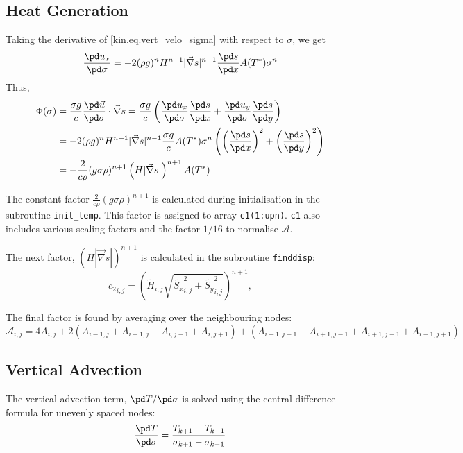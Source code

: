 \subsection{Heat Generation}
Taking the derivative of \eqref{kin.eq.vert_velo_sigma} with respect to $\sigma$, we get
\begin{equation}
  \frac{\pd u_x}{\pd\sigma} = -2(\rho g)^nH^{n+1}|\vec\nabla s|^{n-1}\frac{\pd s}{\pd x}A(T^\ast)\sigma^n
\end{equation}
Thus,
\begin{equation}
\begin{split}
  \Phi(\sigma) &= \frac{\sigma g}c\frac{\pd \vec{u}}{\pd\sigma}\cdot\vec\nabla s  = \frac{\sigma g}c\left(\frac{\pd u_x}{\pd \sigma}\frac{\pd s}{\pd x} + \frac{\pd u_y}{\pd \sigma}\frac{\pd s}{\pd y}\right)\\
       &= -2(\rho g)^nH^{n+1}|\vec\nabla s|^{n-1}\frac{\sigma g}cA(T^\ast)\sigma^n \left(\left(\frac{\pd s}{\pd x}\right)^2+\left(\frac{\pd s}{\pd y}\right)^2\right) \\
       &= -\frac2{c\rho}(g\sigma\rho)^{n+1}\left(H|\vec\nabla s|\right)^{n+1}A(T^\ast)
\end{split}  
\end{equation}

The constant factor $\frac2{c\rho}(g\sigma\rho)^{n+1}$ is calculated during initialisation in the subroutine \texttt{init\_temp}. This factor is assigned to array \texttt{c1(1:upn)}. \texttt{c1} also includes various scaling factors and the factor $1/16$ to normalise $\mathcal{A}$.

The next factor, $\left(H|\vec\nabla s|\right)^{n+1}$ is calculated in the subroutine \texttt{finddisp}:
\begin{equation}
  {c_2}_{i,j} = \left(\tilde{H}_{i,j}\sqrt{\tilde{S_x}_{i,j}^2+\tilde{S_y}_{i,j}^2}\right)^{n+1},
\end{equation}


The final factor is found by averaging over the neighbouring nodes:
\begin{equation}
  \mathcal{A}_{i,j}=4A_{i,j}+2(A_{i-1,j}+A_{i+1,j}+A_{i,j-1}+A_{i,j+1})+(A_{i-1,j-1}+A_{i+1,j-1}+A_{i+1,j+1}+A_{i-1,j+1})
\end{equation}

\subsection{Vertical Advection}
The vertical advection term, $\pd T/\pd\sigma$ is solved using the central difference formula for unevenly spaced nodes:
\begin{equation}
  \frac{\pd T}{\pd\sigma}=\frac{T_{k+1}-T_{k-1}}{\sigma_{k+1}-\sigma_{k-1}}
\end{equation}

